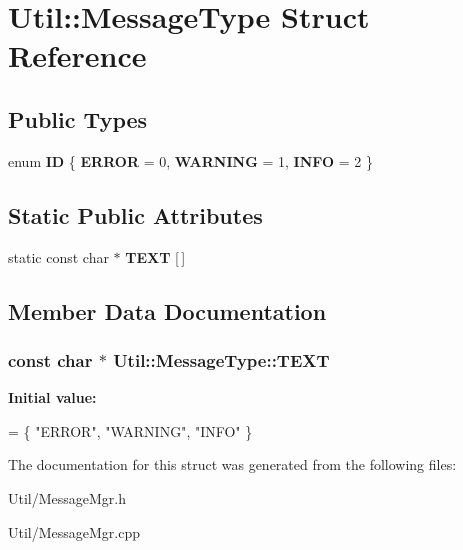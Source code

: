 \hypertarget{struct_util_1_1_message_type}{}\section{Util\+:\+:Message\+Type Struct Reference}
\label{struct_util_1_1_message_type}
\subsection*{Public Types}
\begin{DoxyCompactItemize}
\item 
enum {\bfseries ID} \{ {\bfseries E\+R\+R\+OR} = 0, 
{\bfseries W\+A\+R\+N\+I\+NG} = 1, 
{\bfseries I\+N\+FO} = 2
 \}\hypertarget{struct_util_1_1_message_type_ace447b65f5fb63032ad53da4a8286523}{}\label{struct_util_1_1_message_type_ace447b65f5fb63032ad53da4a8286523}

\end{DoxyCompactItemize}
\subsection*{Static Public Attributes}
\begin{DoxyCompactItemize}
\item 
static const char $\ast$ {\bfseries T\+E\+XT} \mbox{[}$\,$\mbox{]}
\end{DoxyCompactItemize}


\subsection{Member Data Documentation}
\subsubsection[{\texorpdfstring{T\+E\+XT}{TEXT}}]{\setlength{\rightskip}{0pt plus 5cm}const char $\ast$ Util\+::\+Message\+Type\+::\+T\+E\+XT\hspace{0.3cm}{\ttfamily [static]}}\hypertarget{struct_util_1_1_message_type_a8357fd033e4595f6577bb1ec814959ff}{}\label{struct_util_1_1_message_type_a8357fd033e4595f6577bb1ec814959ff}
{\bfseries Initial value\+:}
\begin{DoxyCode}
= \{
        \textcolor{stringliteral}{"ERROR"},
        \textcolor{stringliteral}{"WARNING"},
        \textcolor{stringliteral}{"INFO"} \}
\end{DoxyCode}


The documentation for this struct was generated from the following files\+:\begin{DoxyCompactItemize}
\item 
Util/Message\+Mgr.\+h\item 
Util/Message\+Mgr.\+cpp\end{DoxyCompactItemize}
